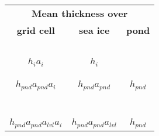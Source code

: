 \documentclass[11pt]{amsart}
\begin{document}
\thicklines

\begin{tabular}{ccc}
\multicolumn{3}{c}{\bf Mean thickness over}\\
\bf grid cell & \bf sea ice & \bf pond \\
\hline
&&\\
&&\\
&&\\
&&\\
&&\\
$h_i a_i$ & $h_i$ & \\
&&\\
&&\\
&&\\
$h_{pnd} a_{pnd} a_i$ & $h_{pnd} a_{pnd}$ & $h_{pnd}$ \\
&&\\
&&\\
&&\\
&&\\
&&\\
&&\\
&&\\
$h_{pnd} a_{pnd} a_{lvl} a_i$ & $h_{pnd} a_{pnd} a_{lvl} $ & $h_{pnd}$ \\

\end{tabular}
\end{document}
